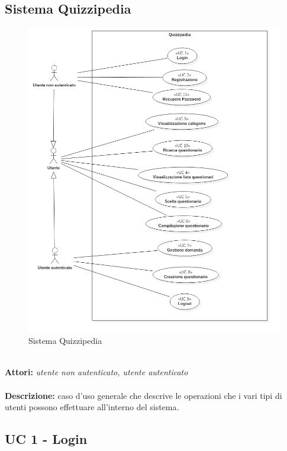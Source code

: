 \documentclass[a4paper,11pt]{article}
\begin{document}
\newpage
\subsection{Sistema Quizzipedia}

\begin{figure}[h!]
\centering
\includegraphics[scale=0.6]{../immagini/Main.png}
\caption{Sistema Quizzipedia}
\end{figure}
\ \\
\textbf{Attori:} \textit{utente non autenticato, utente autenticato}
\\ \\
\textbf{Descrizione:} caso d'uso generale che descrive le operazioni che i vari tipi di utenti possono effettuare all'interno del sistema.\\


\subsection{UC 1 - Login}
\end{document}

